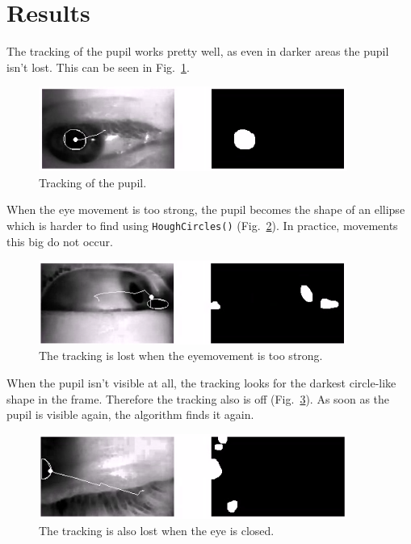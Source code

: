 \section{Results}\label{results}

The tracking of the pupil works pretty well, as even in darker areas the pupil isn't lost. This can be seen in Fig.~\ref{fig:pupil1}.

\begin{figure}[h]
  \centering
  \includegraphics[width=0.9\textwidth]{fin_dark.png}
  \caption{Tracking of the pupil.}\label{fig:pupil1}
\end{figure}

When the eye movement is too strong, the pupil becomes the shape of an ellipse which is harder to find using \texttt{HoughCircles()} (Fig.~\ref{fig:pupillost}). In practice, movements this big do not occur.

\begin{figure}[h]
  \centering
  \includegraphics[width=0.9\textwidth]{fin_lost.png}
  \caption{The tracking is lost when the eyemovement is too strong.}\label{fig:pupillost}
\end{figure}

When the pupil isn't visible at all, the tracking looks for the darkest circle-like shape in the frame. Therefore the tracking also is off (Fig.~\ref{fig:pupilclosed}). As soon as the pupil is visible again, the algorithm finds it again.

\begin{figure}[h]
  \centering
  \includegraphics[width=0.9\textwidth]{fin_closed.png}
  \caption{The tracking is also lost when the eye is closed.}\label{fig:pupilclosed}
\end{figure}

